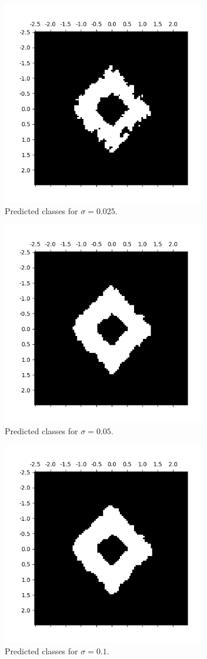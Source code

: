 \begin{figure}[h]
    \centering
    \includegraphics[height=3.5in]{Figure_2_2.png}
    \caption{Predicted classes for $\sigma = 0.025$.}
\end{figure}
\begin{figure}[h]
    \centering
    \includegraphics[height=3.5in]{Figure_2_3.png}
    \caption{Predicted classes for $\sigma = 0.05$.}
\end{figure}
\begin{figure}[h]
    \centering
    \includegraphics[height=3.5in]{Figure_2_4.png}
    \caption{Predicted classes for $\sigma = 0.1$.}
\end{figure}
